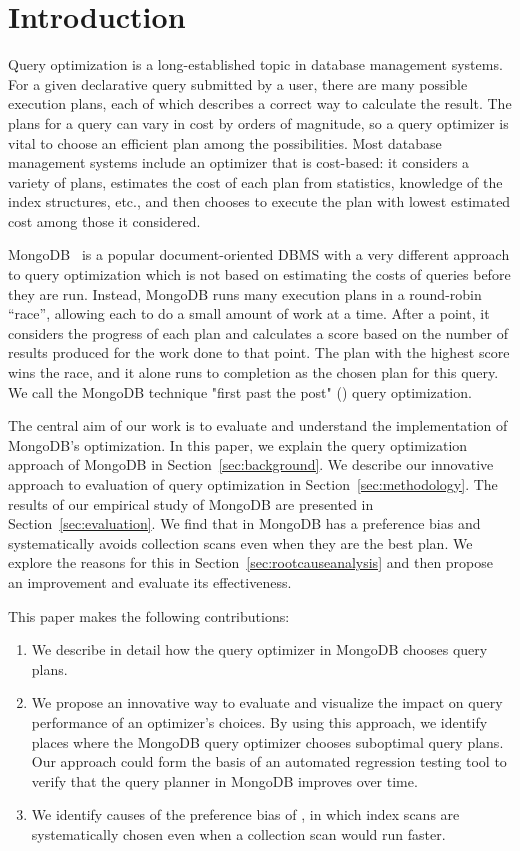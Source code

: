 \section{Introduction}
Query optimization is a long-established topic in database management systems. For a given declarative query submitted by a user, there are many possible execution plans, each of which describes a correct way to calculate the result. The plans for a query can vary in cost by orders of magnitude, so a query optimizer is vital to choose an efficient plan among the possibilities. Most database management systems include an optimizer that is cost-based: it considers a variety of plans, estimates the cost of each plan from statistics, knowledge of the index structures, etc., and then chooses to execute the plan with lowest estimated cost among those it considered. 

MongoDB~\cite{mongodb_2019} is a popular document-oriented DBMS with a very different approach to query optimization which is not based on estimating the costs of queries before they are run. Instead, MongoDB  runs many execution plans in a round-robin ``race'', allowing each to do a small amount of work at a time. After a point, it considers the progress of each plan and calculates a score based on the number of results produced for the work done to that point. The plan with the highest score wins the race, and it alone runs to completion as the chosen plan for this query. We call the MongoDB technique "first past the post" (\approachName) query optimization.  

The central aim of our work is to evaluate and understand the implementation of MongoDB's \approachName optimization. In this paper, we explain the query optimization approach of MongoDB in Section~\ref{sec:background}. We describe our innovative approach to evaluation of query optimization %
in Section~\ref{sec:methodology}.
The results of our empirical study of MongoDB are presented in Section~\ref{sec:evaluation}. We find that \approachName in MongoDB has a preference bias and systematically avoids collection scans even when they are the best plan. We explore the reasons for this in Section~\ref{sec:rootcauseanalysis} and then propose an improvement and evaluate its effectiveness.

This paper makes the following contributions:
\begin{enumerate}
    \item We describe in detail how the \approachName query optimizer in MongoDB chooses query plans.
    \item We propose an innovative way to evaluate and visualize the impact on query performance of an optimizer's choices. By using this approach, we identify places where the MongoDB query optimizer chooses suboptimal query plans.
    Our approach could form the basis of an automated regression testing tool to verify that the query planner in MongoDB improves over time.
    \item We identify causes of the preference bias of \approachName, in which index scans are systematically chosen even when a collection scan would run faster.
\end{enumerate}
